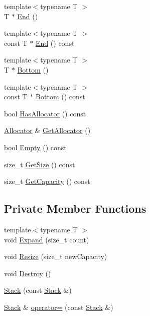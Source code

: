 \begin{DoxyCompactItemize}
\item 
{\footnotesize template$<$typename T $>$ }\\T $\ast$ \mbox{\hyperlink{classrapidjson_1_1internal_1_1_stack_a33ae9809852ea9502dbb3c2d033d997d}{End}} ()
\item 
{\footnotesize template$<$typename T $>$ }\\const T $\ast$ \mbox{\hyperlink{classrapidjson_1_1internal_1_1_stack_a54daa8c82c84fd65ce5a37af4aec8e93}{End}} () const
\item 
{\footnotesize template$<$typename T $>$ }\\T $\ast$ \mbox{\hyperlink{classrapidjson_1_1internal_1_1_stack_a0855652d8ebbaa8a9299bfcdf81c47c2}{Bottom}} ()
\item 
{\footnotesize template$<$typename T $>$ }\\const T $\ast$ \mbox{\hyperlink{classrapidjson_1_1internal_1_1_stack_a13ee4775d8febba763b67dc8114beaa5}{Bottom}} () const
\item 
bool \mbox{\hyperlink{classrapidjson_1_1internal_1_1_stack_a2167273a8e50c7d7fc9749d8f246c12c}{Has\+Allocator}} () const
\item 
\mbox{\hyperlink{classrapidjson_1_1_allocator}{Allocator}} \& \mbox{\hyperlink{classrapidjson_1_1internal_1_1_stack_adb7cca61d3d77dd12189027882470e0c}{Get\+Allocator}} ()
\item 
bool \mbox{\hyperlink{classrapidjson_1_1internal_1_1_stack_ac5d92c6efa27f38e3a625bc495d95151}{Empty}} () const
\item 
size\+\_\+t \mbox{\hyperlink{classrapidjson_1_1internal_1_1_stack_a9379b6a185340ef704a0a78e39366fd6}{Get\+Size}} () const
\item 
size\+\_\+t \mbox{\hyperlink{classrapidjson_1_1internal_1_1_stack_a280f80cf4d173edbec3feba59468a149}{Get\+Capacity}} () const
\end{DoxyCompactItemize}
\subsection*{Private Member Functions}
\begin{DoxyCompactItemize}
\item 
{\footnotesize template$<$typename T $>$ }\\void \mbox{\hyperlink{classrapidjson_1_1internal_1_1_stack_a33149301e7a60dbd1fe9b66c2c9e80ea}{Expand}} (size\+\_\+t count)
\item 
void \mbox{\hyperlink{classrapidjson_1_1internal_1_1_stack_ab2b7ea84cc9c009836c1413c2bf1771b}{Resize}} (size\+\_\+t new\+Capacity)
\item 
void \mbox{\hyperlink{classrapidjson_1_1internal_1_1_stack_a6e9409fc62cdd2ad72137f051fbbb5a8}{Destroy}} ()
\item 
\mbox{\hyperlink{classrapidjson_1_1internal_1_1_stack_a847c6fa5e362beeaa3b12e0bcbcb32ca}{Stack}} (const \mbox{\hyperlink{classrapidjson_1_1internal_1_1_stack}{Stack}} \&)
\item 
\mbox{\hyperlink{classrapidjson_1_1internal_1_1_stack}{Stack}} \& \mbox{\hyperlink{classrapidjson_1_1internal_1_1_stack_a7d0b83798d0c29b50103841fe61ba7d9}{operator=}} (const \mbox{\hyperlink{classrapidjson_1_1internal_1_1_stack}{Stack}} \&)
\end{DoxyCompactItemize}

